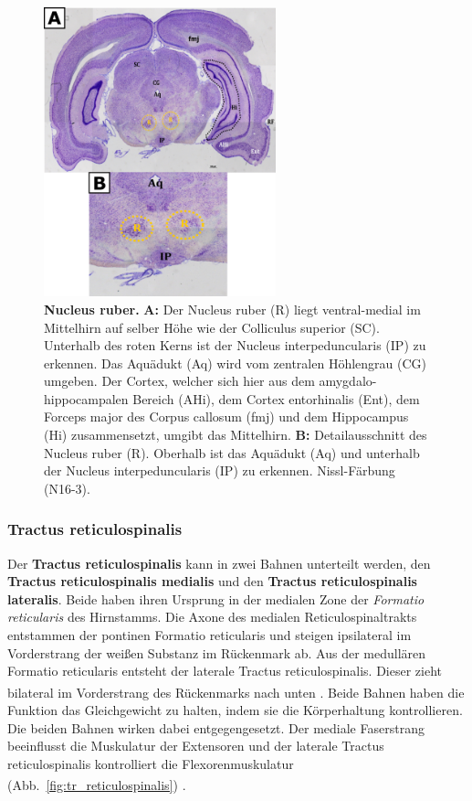 \begin{figure}[H]
    \centering
    \includegraphics[width=0.6\textwidth]{pictures/Bilder_Laura/red_nucleus_N16_3P_025x.png}
    \caption[Nucleus ruber]{\textbf{Nucleus ruber.} \textbf{A:} Der Nucleus ruber (R) liegt ventral-medial im Mittelhirn auf selber Höhe wie der Colliculus superior (SC). Unterhalb des roten Kerns ist der Nucleus interpeduncularis (IP) zu erkennen. Das Aquädukt (Aq) wird vom zentralen Höhlengrau (CG) umgeben. Der Cortex, welcher sich hier aus dem  amygdalo-hippocampalen Bereich (AHi), dem Cortex entorhinalis (Ent), dem Forceps major des Corpus callosum (fmj) und dem Hippocampus (Hi) zusammensetzt, umgibt das Mittelhirn. \textbf{B:} Detailausschnitt des Nucleus ruber (R). Oberhalb ist das Aquädukt (Aq) und unterhalb der Nucleus interpeduncularis (IP) zu erkennen. Nissl-Färbung (N16-3).}
    \label{fig:roter_Kern}
\end{figure}

\subsubsection{Tractus reticulospinalis}  \label{subsubsec:reticulospinalis}
Der \textbf{Tractus reticulospinalis} kann in zwei Bahnen unterteilt werden, den \textbf{Tractus reticulospinalis medialis} und den \textbf{Tractus reticulospinalis lateralis}. Beide haben ihren Ursprung in der medialen Zone der \textit{Formatio reticularis} des Hirnstamms. Die Axone des medialen Reticulospinaltrakts entstammen der pontinen Formatio reticularis und steigen ipsilateral im Vorderstrang der weißen Substanz im Rückenmark ab. Aus der medullären Formatio reticularis entsteht der laterale Tractus reticulospinalis. Dieser zieht bilateral im Vorderstrang des Rückenmarks nach unten \textsuperscript{\cite[8]{crossman2014neuroanatomy}}. Beide Bahnen haben die Funktion das Gleichgewicht zu halten, indem sie die Körperhaltung kontrollieren. Die beiden Bahnen wirken dabei entgegengesetzt. Der mediale Faserstrang beeinflusst die Muskulatur der Extensoren und der laterale Tractus reticulospinalis kontrolliert die Flexorenmuskulatur (Abb.~\ref{fig:tr_reticulospinalis}) \textsuperscript{\cite[14]{neurowissenschaften_baer}}.


